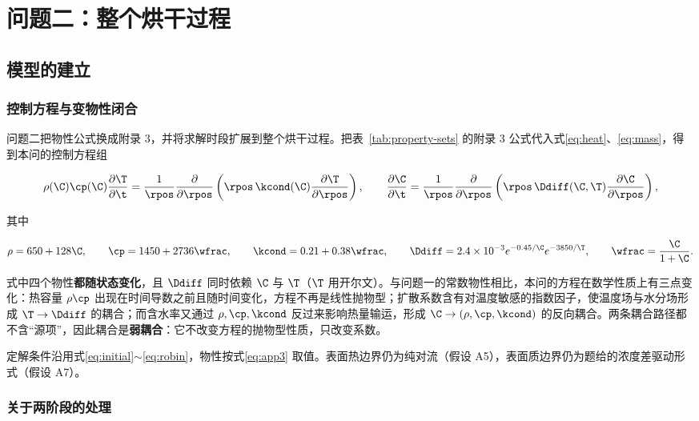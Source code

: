 \section{问题二：整个烘干过程}
\label{sec:q2}

\subsection{模型的建立}
\label{sec:q2model}

\subsubsection{控制方程与变物性闭合}

问题二把物性公式换成附录 3，并将求解时段扩展到整个烘干过程。把表~\ref{tab:property-sets} 的附录 3 公式代入式\eqref{eq:heat}、\eqref{eq:mass}，得到本问的控制方程组

\begin{equation}
\rho(\C)\cp(\C)\frac{\partial \T}{\partial \t}
=\frac{1}{\rpos}\frac{\partial}{\partial \rpos}\left(\rpos\,\kcond(\C)\frac{\partial \T}{\partial \rpos}\right),
\qquad
\frac{\partial \C}{\partial \t}
=\frac{1}{\rpos}\frac{\partial}{\partial \rpos}\left(\rpos\,\Ddiff(\C,\T)\frac{\partial \C}{\partial \rpos}\right),
\label{eq:q2system}
\end{equation}

其中

\begin{equation}
\rho=650+128\C,\qquad
\cp=1450+2736\wfrac,\qquad
\kcond=0.21+0.38\wfrac,\qquad
\Ddiff=2.4\times10^{-3}e^{-0.45/\C}e^{-3850/\T},
\qquad \wfrac=\frac{\C}{1+\C}.
\label{eq:app3}
\end{equation}

式中四个物性\textbf{都随状态变化}，且 $\Ddiff$ 同时依赖 $\C$ 与 $\T$（$\T$ 用开尔文）。与问题一的常数物性相比，本问的方程在数学性质上有三点变化：热容量 $\rho\cp$ 出现在时间导数之前且随时间变化，方程不再是线性抛物型；扩散系数含有对温度敏感的指数因子，使温度场与水分场形成 $\T\to\Ddiff$ 的耦合；而含水率又通过 $\rho,\cp,\kcond$ 反过来影响热量输运，形成 $\C\to(\rho,\cp,\kcond)$ 的反向耦合。两条耦合路径都不含``源项''，因此耦合是\textbf{弱耦合}：它不改变方程的抛物型性质，只改变系数。

定解条件沿用式\eqref{eq:initial}$\sim$\eqref{eq:robin}，物性按式\eqref{eq:app3} 取值。表面热边界仍为纯对流（假设 A5），表面质边界仍为题给的浓度差驱动形式（假设 A7）。

\subsubsection{关于两阶段的处理}

